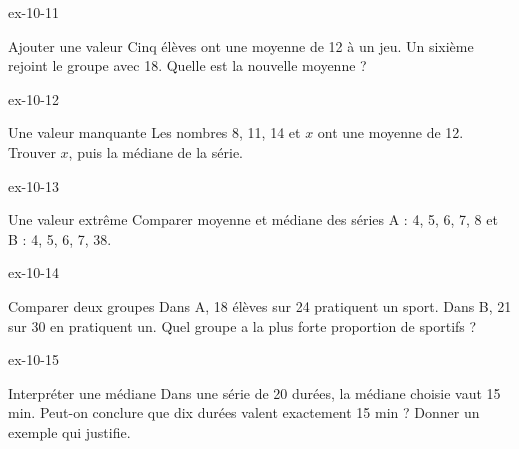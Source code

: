 \begin{blocLivre}{ex-10-11}\begin{exercice}[3]{Ajouter une valeur}
Cinq élèves ont une moyenne de 12 à un jeu. Un sixième rejoint le groupe avec 18. Quelle est la nouvelle moyenne ?
\end{exercice}\end{blocLivre}
\begin{blocLivre}{ex-10-12}\begin{exercice}[3]{Une valeur manquante}
Les nombres 8, 11, 14 et $x$ ont une moyenne de 12. Trouver $x$, puis la médiane de la série.
\end{exercice}\end{blocLivre}
\begin{blocLivre}{ex-10-13}\begin{exercice}[3]{Une valeur extrême}
Comparer moyenne et médiane des séries A : 4, 5, 6, 7, 8 et B : 4, 5, 6, 7, 38.
\end{exercice}\end{blocLivre}
\begin{blocLivre}{ex-10-14}\begin{exercice}[3]{Comparer deux groupes}
Dans A, 18 élèves sur 24 pratiquent un sport. Dans B, 21 sur 30 en pratiquent un. Quel groupe a la plus forte proportion de sportifs ?
\end{exercice}\end{blocLivre}
\begin{blocLivre}{ex-10-15}\begin{exercice}[3]{Interpréter une médiane}
Dans une série de 20 durées, la médiane choisie vaut 15 min. Peut-on conclure que dix durées valent exactement 15 min ? Donner un exemple qui justifie.
\end{exercice}\end{blocLivre}

\clearpage
